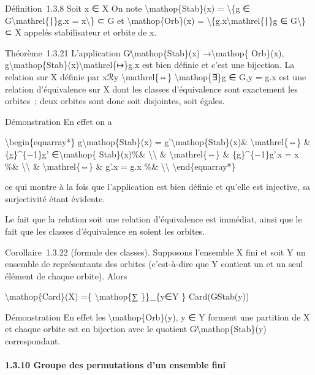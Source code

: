 \documentclass[]{article}
\begin{document}
Définition~1.3.8 Soit x ∈ X On note \textbackslash{}mathop\{Stab\}(x) =
\textbackslash{}\{g ∈ G\textbackslash{}mathrel\{∣\}g.x =
x\textbackslash{}\} ⊂ G et \textbackslash{}mathop\{Orb\}(x) =
\textbackslash{}\{g.x\textbackslash{}mathrel\{∣\}g ∈ G\textbackslash{}\}
⊂ X appelés stabilisateur et orbite de x.

Théorème~1.3.21 L'application G∕\textbackslash{}mathop\{Stab\}(x)
→\textbackslash{}mathop\{ Orb\}(x),
g\textbackslash{}mathop\{Stab\}(x)\textbackslash{}mathrel\{↦\}g.x est
bien définie et c'est une bijection. La relation sur X définie par xℛy
\textbackslash{}mathrel\{⇔\} \textbackslash{}mathop\{∃\}g ∈ G,y = g.x
est une relation d'équivalence sur X dont les classes d'équivalence sont
exactement les orbites~; deux orbites sont donc soit disjointes, soit
égales.

Démonstration En effet on a

\textbackslash{}begin\{eqnarray*\} g\textbackslash{}mathop\{Stab\}(x) =
g'\textbackslash{}mathop\{Stab\}(x)\& \textbackslash{}mathrel\{⇔\} \&
\{g\}\^{}\{−1\}g' ∈\textbackslash{}mathop\{ Stab\}(x)\%\&
\textbackslash{}\textbackslash{} \& \textbackslash{}mathrel\{⇔\} \&
\{g\}\^{}\{−1\}g'.x = x \%\& \textbackslash{}\textbackslash{} \&
\textbackslash{}mathrel\{⇔\} \& g'.x = g.x \%\&
\textbackslash{}\textbackslash{} \textbackslash{}end\{eqnarray*\}

ce qui montre à la fois que l'application est bien définie et qu'elle
est injective, sa surjectivité étant évidente.

Le fait que la relation soit une relation d'équivalence est immédiat,
ainsi que le fait que les classes d'équivalence en soient les orbites.

Corollaire~1.3.22 (formule des classes). Supposons l'ensemble X fini et
soit Y un ensemble de représentants des orbites (c'est-à-dire que Y
contient un et un seul élément de chaque orbite). Alors

\textbackslash{}mathop\{Card\}(X) =\{ \textbackslash{}mathop\{∑
\}\}\_\{y∈Y \} Card(G∕Stab(y))

Démonstration En effet les \textbackslash{}mathop\{Orb\}(y), y ∈ Y
forment une partition de X et chaque orbite est en bijection avec le
quotient G∕\textbackslash{}mathop\{Stab\}(y) correspondant.

\paragraph{1.3.10 Groupe des permutations d'un ensemble fini}
\end{document}
